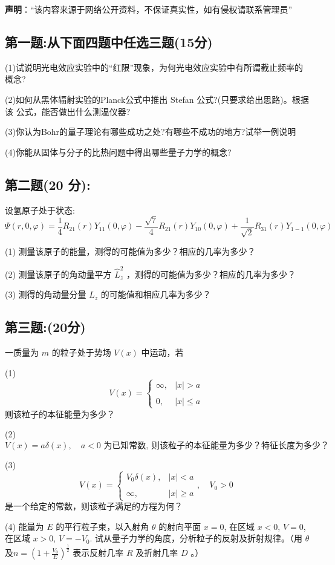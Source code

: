 
\textbf{声明}：“该内容来源于网络公开资料，不保证真实性，如有侵权请联系管理员”

\subsection{第一题:从下面四题中任选三题(15分)}

(1)试说明光电效应实验中的“红限”现象，为何光电效应实验中有所谓截止频率的概念?

(2)如何从黑体辐射实验的Planck公式中推出 Stefan 公式?(只要求给出思路)。根据该
公式，能否做出什么测温仪器?

(3)你认为Bohr的量子理论有哪些成功之处?有哪些不成功的地方?试举一例说明

(4)你能从固体与分子的比热问题中得出哪些量子力学的概念?
\subsection{第二题(20 分):}
设氢原子处于状态:
\[\Psi(r,  0, \varphi) = \frac{1}{4} R_{21}(r) Y_{11}(0, \varphi) - \frac{\sqrt{7}}{4} R_{21}(r) Y_{10}(0, \varphi) + \frac{1}{\sqrt{2}} R_{31}(r) Y_{1-1}(0, \varphi)~\]

(1) 测量该原子的能量，测得的可能值为多少？相应的几率为多少？

(2) 测量该原子的角动量平方 $\hat{L}_z^2$ ，测得的可能值为多少？相应的几率为多少？

(3) 测得的角动量分量 $L_z$ 的可能值和相应几率为多少？
\subsection{第三题:(20分)}
一质量为 $m$ 的粒子处于势场 $V(x)$ 中运动，若

(1) 
\[V(x) = \begin{cases} \infty, & |x| > a \\\\0, & |x| \leq a \end{cases}~\]
则该粒子的本征能量为多少？

(2) 
\[V(x) = a \delta(x), \quad a < 0 \text{ 为已知常数, 则该粒子的本征能量为多少？特征长度为多少？}~\]

(3) 
\[V(x) = \begin{cases} V_0\delta(x), & |x| < a \\\\\infty, & |x| \geq a \end{cases}, \quad V_0 > 0~\]
是一个给定的常数，则该粒子满足的方程为何？

(4) 
能量为 $E$ 的平行粒子束，以入射角 $\theta$ 的射向平面 $x = 0$, 在区域 $x < 0$, $V = 0$, 在区域 $x > 0$, $V = -V_0$. 试从量子力学的角度，分析粒子的反射及折射规律。（用 $\theta$ 及$n = \left( 1 + \frac{V_0}{E} \right)^{\frac{1}{2}}$
表示反射几率 $R$ 及折射几率 $D$ 。）